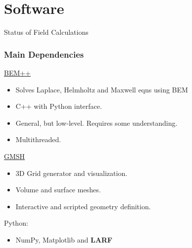 \documentclass[xcolor=dvipsnames]{beamer}
\begin{document}
\section{Software}

\begin{frame}{Status of Field Calculations}
  \tableofcontents[currentsection]
\end{frame}

\begin{frame}
  \frametitle{Main Dependencies}

  \href{http://www.bempp.org/}{BEM++}
  \begin{itemize}
  \item Solves Laplace, Helmholtz and Maxwell eqns using BEM
  \item C++ with Python interface.
  \item General, but low-level.  Requires some understanding.
  \item Multithreaded.
  \end{itemize}

  \href{http://gmsh.info}{GMSH}
  \begin{itemize}
  \item 3D Grid generator and visualization.
  \item Volume and surface meshes.
  \item Interactive and scripted geometry definition.
  \end{itemize}

  Python:
  \begin{itemize}
  \item NumPy, Matplotlib and \textbf{LARF}
  \end{itemize}
\end{frame}
\end{document}
